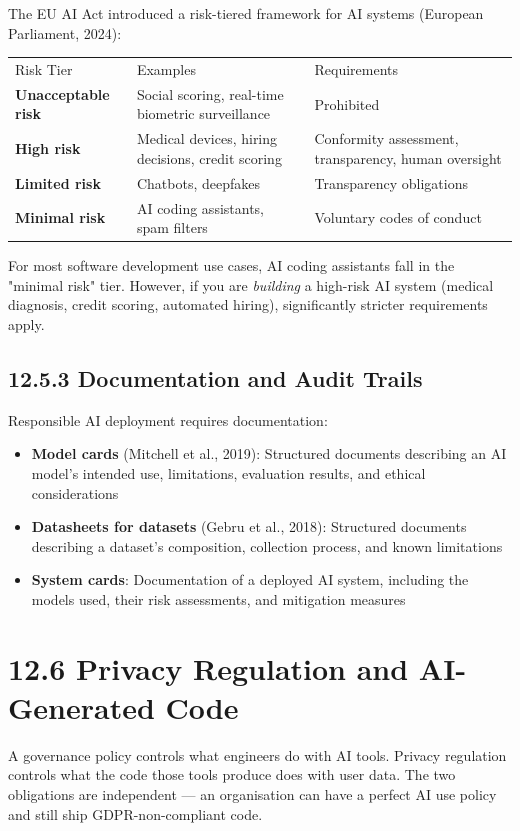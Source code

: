 \documentclass[11pt,a4paper]{book}
\begin{document}
The EU AI Act introduced a risk-tiered framework for AI systems (European Parliament, 2024):

\begin{tabular}{lll}
\hline
Risk Tier & Examples & Requirements \\
\textbf{Unacceptable risk} & Social scoring, real-time biometric surveillance & Prohibited \\
\textbf{High risk} & Medical devices, hiring decisions, credit scoring & Conformity assessment, transparency, human oversight \\
\textbf{Limited risk} & Chatbots, deepfakes & Transparency obligations \\
\textbf{Minimal risk} & AI coding assistants, spam filters & Voluntary codes of conduct \\
\hline
\end{tabular}

For most software development use cases, AI coding assistants fall in the "minimal risk" tier. However, if you are \textit{building} a high-risk AI system (medical diagnosis, credit scoring, automated hiring), significantly stricter requirements apply.

\subsection{12.5.3 Documentation and Audit Trails}

Responsible AI deployment requires documentation:
\begin{itemize}
  \item \textbf{Model cards} (Mitchell et al., 2019): Structured documents describing an AI model's intended use, limitations, evaluation results, and ethical considerations
  \item \textbf{Datasheets for datasets} (Gebru et al., 2018): Structured documents describing a dataset's composition, collection process, and known limitations
  \item \textbf{System cards}: Documentation of a deployed AI system, including the models used, their risk assessments, and mitigation measures
\end{itemize}

\medskip

\section{12.6 Privacy Regulation and AI-Generated Code}

A governance policy controls what engineers do with AI tools. Privacy regulation controls what the code those tools produce does with user data. The two obligations are independent --- an organisation can have a perfect AI use policy and still ship GDPR-non-compliant code.
\end{document}
